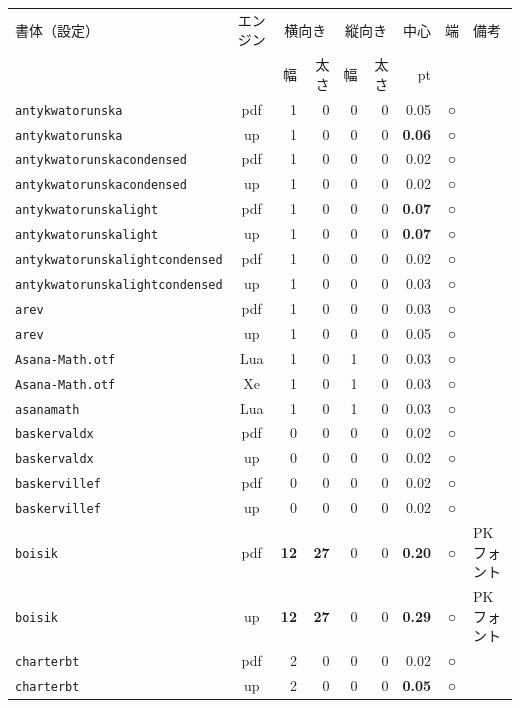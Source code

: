 \begin{longtable}{@{}lcrrrrrcl@{}}
書体（設定） & エンジン & \multicolumn{2}{c}{横向き} & \multicolumn{2}{c}{縦向き} & 中心 & 端 & 備考\\
 & & 幅 & 太さ & 幅 & 太さ & pt & & \\\hline\endhead
\texttt{antykwatorunska} & pdf & 1 & 0 & 0 & 0 & 0.05 & ○ & \\
\texttt{antykwatorunska} & up & 1 & 0 & 0 & 0 & \textbf{0.06} & ○ & \\
\texttt{antykwatorunskacondensed} & pdf & 1 & 0 & 0 & 0 & 0.02 & ○ & \\
\texttt{antykwatorunskacondensed} & up & 1 & 0 & 0 & 0 & 0.02 & ○ & \\
\texttt{antykwatorunskalight} & pdf & 1 & 0 & 0 & 0 & \textbf{0.07} & ○ & \\
\texttt{antykwatorunskalight} & up & 1 & 0 & 0 & 0 & \textbf{0.07} & ○ & \\
\texttt{antykwatorunskalightcondensed} & pdf & 1 & 0 & 0 & 0 & 0.02 & ○ & \\
\texttt{antykwatorunskalightcondensed} & up & 1 & 0 & 0 & 0 & 0.03 & ○ & \\
\texttt{arev} & pdf & 1 & 0 & 0 & 0 & 0.03 & ○ & \\
\texttt{arev} & up & 1 & 0 & 0 & 0 & 0.05 & ○ & \\
\texttt{Asana-Math.otf} & Lua & 1 & 0 & 1 & 0 & 0.03 & ○ & \\
\texttt{Asana-Math.otf} & Xe & 1 & 0 & 1 & 0 & 0.03 & ○ & \\
\texttt{asanamath} & Lua & 1 & 0 & 1 & 0 & 0.03 & ○ & \\
\texttt{baskervaldx} & pdf & 0 & 0 & 0 & 0 & 0.02 & ○ & \\
\texttt{baskervaldx} & up & 0 & 0 & 0 & 0 & 0.02 & ○ & \\
\texttt{baskervillef} & pdf & 0 & 0 & 0 & 0 & 0.02 & ○ & \\
\texttt{baskervillef} & up & 0 & 0 & 0 & 0 & 0.02 & ○ & \\
\texttt{boisik} & pdf & \textbf{12} & \textbf{27} & 0 & 0 & \textbf{0.20} & ○ & PKフォント\\
\texttt{boisik} & up & \textbf{12} & \textbf{27} & 0 & 0 & \textbf{0.29} & ○ & PKフォント\\
\texttt{charterbt} & pdf & 2 & 0 & 0 & 0 & 0.02 & ○ & \\
\texttt{charterbt} & up & 2 & 0 & 0 & 0 & \textbf{0.05} & ○ & \\

\end{longtable}
